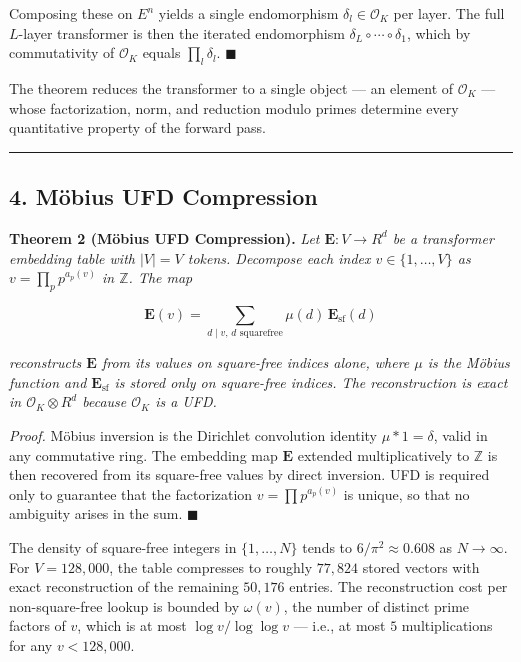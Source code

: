 \documentclass[
  11pt,
]{article}
\begin{document}
Composing these on \(E^n\) yields a single endomorphism
\(\delta_l \in \mathcal{O}_K\) per layer. The full \(L\)-layer
transformer is then the iterated endomorphism
\(\delta_L \circ \cdots \circ \delta_1\), which by commutativity of
\(\mathcal{O}_K\) equals \(\prod_l \delta_l\). \(\blacksquare\)

The theorem reduces the transformer to a single object --- an element of
\(\mathcal{O}_K\) --- whose factorization, norm, and reduction modulo
primes determine every quantitative property of the forward pass.

\begin{center}\rule{0.5\linewidth}{0.5pt}\end{center}

\hypertarget{muxf6bius-ufd-compression}{%
\subsection{4. Möbius UFD Compression}\label{muxf6bius-ufd-compression}}

\textbf{Theorem 2 (Möbius UFD Compression).} \emph{Let
\(\mathbf{E} : V \to R^d\) be a transformer embedding table with
\(|V| = V\) tokens. Decompose each index \(v \in \{1, \dots, V\}\) as
\(v = \prod_p p^{a_p(v)}\) in \(\mathbb{Z}\). The map}

\[\mathbf{E}(v) = \sum_{d \mid v, \, d \text{ squarefree}} \mu(d) \, \mathbf{E}_{\text{sf}}(d)\]

\emph{reconstructs \(\mathbf{E}\) from its values on square-free indices
alone, where \(\mu\) is the Möbius function and
\(\mathbf{E}_{\text{sf}}\) is stored only on square-free indices. The
reconstruction is exact in \(\mathcal{O}_K \otimes R^d\) because
\(\mathcal{O}_K\) is a UFD.}

\emph{Proof.} Möbius inversion is the Dirichlet convolution identity
\(\mu * 1 = \delta\), valid in any commutative ring. The embedding map
\(\mathbf{E}\) extended multiplicatively to \(\mathbb{Z}\) is then
recovered from its square-free values by direct inversion. UFD is
required only to guarantee that the factorization
\(v = \prod p^{a_p(v)}\) is unique, so that no ambiguity arises in the
sum. \(\blacksquare\)

The density of square-free integers in \(\{1, \dots, N\}\) tends to
\(6/\pi^2 \approx 0.608\) as \(N \to \infty\). For \(V = 128{,}000\),
the table compresses to roughly \(77{,}824\) stored vectors with exact
reconstruction of the remaining \(50{,}176\) entries. The reconstruction
cost per non-square-free lookup is bounded by \(\omega(v)\), the number
of distinct prime factors of \(v\), which is at most
\(\log v / \log \log v\) --- i.e., at most \(5\) multiplications for any
\(v < 128{,}000\).
\end{document}
